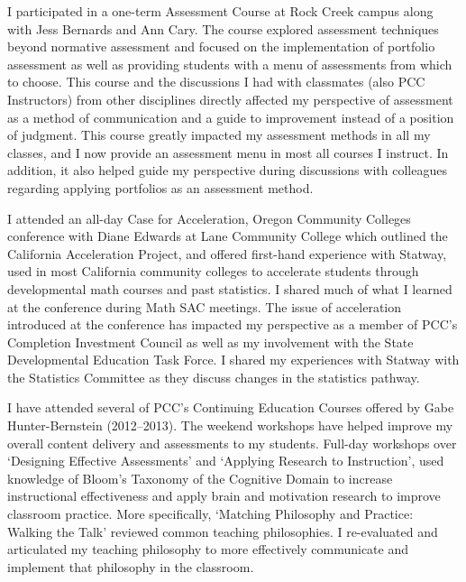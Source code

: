 \begin{description}[style=nextline]
	\item[Jeff Pettit (Full-time Instructor, Rock Creek Campus)]
	I participated in a one-term Assessment Course at Rock Creek campus along with
	Jess Bernards and Ann Cary. The course explored assessment techniques beyond
	normative assessment and focused on the implementation of portfolio assessment
	as well as providing students with a menu of assessments from which to choose.
	This course and the discussions I had with classmates (also PCC Instructors)
	from other disciplines directly affected my perspective of assessment as a
	method of communication and a guide to improvement instead of a position of
	judgment. This course greatly impacted my assessment methods in all my classes,
	and I now provide an assessment menu in most all courses I instruct. In
	addition, it also helped guide my perspective during discussions with
	colleagues regarding applying portfolios as an assessment method.

	I attended an all-day Case for Acceleration, Oregon Community Colleges
	conference with Diane Edwards at Lane Community College which outlined the
	California Acceleration Project, and offered first-hand experience with
	Statway, used in most California community colleges to accelerate students
	through developmental math courses and past statistics. I shared much of what I
	learned at the conference during Math SAC meetings. The issue of acceleration
	introduced at the conference has impacted my perspective as a member of
	PCC's Completion Investment Council as well as my involvement with the State
	Developmental Education Task Force. I shared my experiences with Statway with
	the Statistics Committee as they discuss changes in the statistics pathway.

	\item[Dennis Reynolds (Full-time Instructor, Rock Creek Campus)]
	I have attended several of PCC's Continuing Education Courses offered by
	Gabe Hunter-Bernstein (2012--2013).  The weekend workshops have helped
	improve my overall content delivery and assessments to my students. Full-day
	workshops over `Designing Effective Assessments' and `Applying
	Research to Instruction', used knowledge of Bloom's Taxonomy of the
	Cognitive Domain to increase instructional effectiveness and apply brain and
	motivation research to improve classroom practice. More specifically,
	`Matching Philosophy and Practice: Walking the Talk' reviewed common
	teaching philosophies. I re-evaluated and articulated my teaching philosophy to
	more effectively communicate and implement that philosophy in the classroom.


\end{description}
